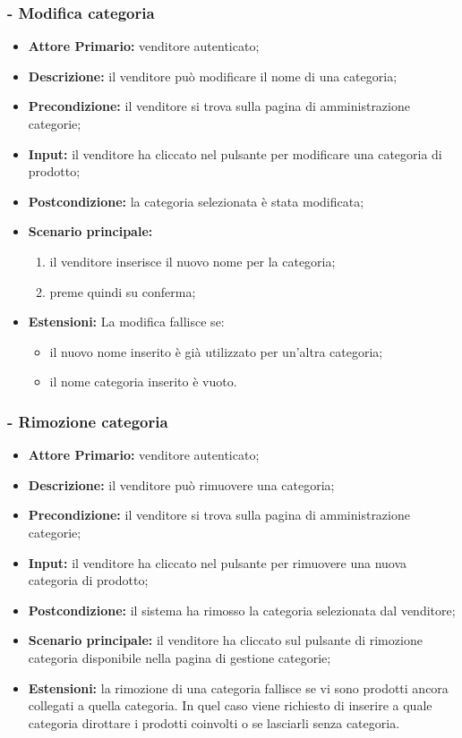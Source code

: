 \subsubsection{- Modifica categoria}
\begin{itemize}
    \item \textbf{Attore Primario:} venditore autenticato;
    \item \textbf{Descrizione:} il venditore può modificare il nome di una categoria;
    \item \textbf{Precondizione:} il venditore si trova sulla pagina di amministrazione categorie;
    \item \textbf{Input:} il venditore ha cliccato nel pulsante per modificare una categoria di prodotto;
    \item \textbf{Postcondizione:} la categoria selezionata è stata modificata;
    \item \textbf{Scenario principale:}
    \begin{enumerate}
        \item il venditore inserisce il nuovo nome per la categoria;
        \item preme quindi su conferma;
    \end{enumerate}
    \item \textbf{Estensioni:} La modifica fallisce se:
    \begin{itemize}
        \item il nuovo nome inserito è già utilizzato per un'altra categoria;
        \item il nome categoria inserito è vuoto.
    \end{itemize}
\end{itemize}

\stepsubUserCase
\subsubsection{- Rimozione categoria}
\begin{itemize}
    \item \textbf{Attore Primario:} venditore autenticato;
    \item \textbf{Descrizione:} il venditore può rimuovere una categoria;
    \item \textbf{Precondizione:} il venditore si trova sulla pagina di amministrazione categorie;
    \item \textbf{Input:} il venditore ha cliccato nel pulsante per rimuovere una nuova categoria di prodotto;
    \item \textbf{Postcondizione:} il sistema ha rimosso la categoria selezionata dal venditore;
    \item \textbf{Scenario principale:} il venditore ha cliccato sul pulsante di rimozione categoria disponibile nella pagina di gestione categorie;
    \item \textbf{Estensioni:} la rimozione di una categoria fallisce se vi sono prodotti ancora collegati a quella categoria. In quel caso viene richiesto
                                di inserire a quale categoria dirottare i prodotti coinvolti o se lasciarli senza categoria.
\end{itemize}

